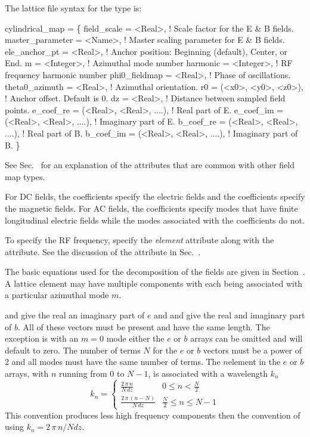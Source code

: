 The lattice file syntax for the  type is:
\begin{example}
  cylindrical_map = \{
    field_scale      = <Real>,    ! Scale factor for the E & B fields.
    master_parameter = <Name>,    ! Master scaling parameter for E & B fields.
    ele_anchor_pt    = <Real>,    ! Anchor position: Beginning (default), Center, or End.
    m                = <Integer>, ! Azimuthal mode number
    harmonic         = <Integer>, ! RF frequency harmonic number 
    phi0_fieldmap    = <Real>,    ! Phase of oscillations.
    theta0_azimuth   = <Real>,    ! Azimuthal orientation.
    r0               = (<x0>, <y0>, <z0>), ! Anchor offset. Default is 0.
    dz        = <Real>,                    ! Distance between sampled field points.
    e_coef_re = (<Real>, <Real>, ....),    ! Real part of E.
    e_coef_im = (<Real>, <Real>, ....),    ! Imaginary part of E.
    b_coef_re = (<Real>, <Real>, ....),    ! Real part of B.
    b_coef_im = (<Real>, <Real>, ....),    ! Imaginary part of B.
  \}
\end{example}
See Sec.~ for an explanation of the attributes that are common with
other field map types.

For DC fields, the  coefficients specify the electric fields and the  coefficients
specify the magnetic fields. For AC fields, the  coefficients specify modes that have finite
longitudinal electric fields while the modes associated with the  coefficients do not.

To specify the RF frequency, specify the  {\em element} attribute along with
the  attribute. See the discussion of the  attribute in 
Sec.~.

The basic equations used for the  decomposition of the fields are given in
Section~. A lattice element may have multiple 
components with each  being associated with a particular azimuthal mode $m$.

 and  give the real an imaginary part of $e$ and  and  give the
real and imaginary part of $b$. All of these vectors must be present and have the same length. The
exception is with an $m = 0$ mode either the $e$ or $b$ arrays can be omitted and will default to
zero. The number of terms $N$ for the $e$ or $b$ vectors must be a power of $2$ and all modes must
have the same number of terms. The $n$\Th element in the $e$ or $b$ arrays, with $n$ running from 0
to $N-1$, is associated with a wavelength $k_n$
\begin{equation}
  k_n = \begin{cases}
    \frac{2 \, \pi \, n}{N \, dz} & 0 \le n < \frac{N}{2} \\
    \frac{2 \, \pi \, (n-N)}{N \, dz} & \frac{N}{2} \le n \le N - 1
  \end{cases}
\end{equation}
This convention produces less high frequency components then the convention of using $k_n = 2 \, \pi
\, n / N dz$.

